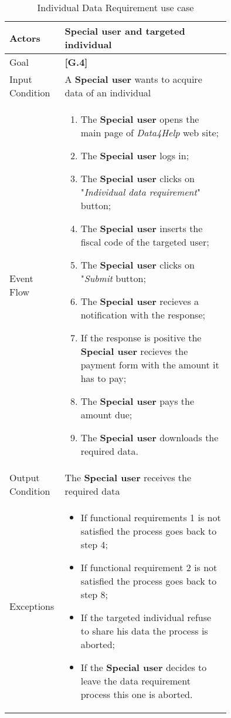 \begin{center}
\begin{table}
\begin{tabular}{ | l | p{0.75\linewidth} | }
  \hline
    Actors & \textbf{Special user} and targeted individual \\ \hline
    Goal & \textbf{[G.4]} \\ \hline
    Input Condition & A \textbf{Special user} wants to acquire data of an individual \\ \hline
    Event Flow & \begin{minipage}[t]{0.7\textwidth}
      \begin{enumerate}
        \item The \textbf{Special user} opens the main page of \textit{Data4Help} web site;
        \item The \textbf{Special user} logs in;
        \item The \textbf{Special user} clicks on "\textit{Individual data requirement}" button;
        \item The \textbf{Special user} inserts the fiscal code of the targeted user;
        \item The \textbf{Special user} clicks on "\textit{Submit} button;
        \item The \textbf{Special user} recieves a notification with the response;
        \item If the response is positive the \textbf{Special user} recieves the payment form with the amount it has to pay;
        \item The \textbf{Special user} pays the amount due;
        \item The \textbf{Special user} downloads the required data.
      \end{enumerate}
    \smallskip
  \end{minipage} \\ \hline
  Output Condition & The \textbf{Special user} receives the required data \\ \hline
  Exceptions & \begin{minipage}[t]{0.7\textwidth}
    \begin{itemize}
      \smallskip
      \item If functional requirements 1 is not satisfied the process goes back to step 4;
      \item If functional requirement 2 is not satisfied the process goes back to step 8;
      \item If the targeted individual refuse to share his data the process is aborted;
      \item If the \textbf{Special user} decides to leave the data requirement process this one is aborted.
    \end{itemize}
    \smallskip
  \end{minipage}  \\ \hline
\end{tabular}
\caption{Individual Data Requirement use case}
\label{table:individualDataRequirement}
\end{table}
\end{center}
